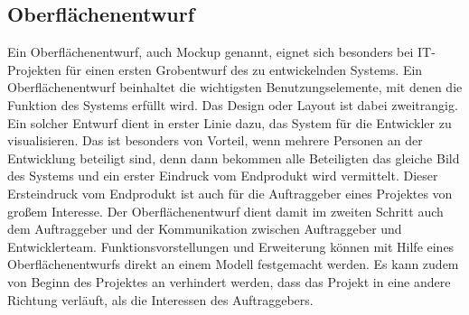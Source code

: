 \subsection{Oberflächenentwurf}
\label{sec:Oberflaechenentwuf}

Ein Oberflächenentwurf, auch Mockup genannt, eignet sich besonders bei IT-Projekten für einen ersten Grobentwurf des zu entwickelnden Systems. Ein Oberflächenentwurf beinhaltet die wichtigsten Benutzungselemente, mit denen die Funktion des Systems erfüllt wird. Das Design oder Layout ist dabei zweitrangig. Ein solcher Entwurf dient in erster Linie dazu, das System für die Entwickler zu visualisieren. Das ist besonders von Vorteil, wenn mehrere Personen an der Entwicklung beteiligt sind, denn dann bekommen alle Beteiligten das gleiche Bild des Systems und ein erster Eindruck vom Endprodukt wird vermittelt. Dieser Ersteindruck vom Endprodukt ist auch für die Auftraggeber eines Projektes von großem Interesse. Der Oberflächenentwurf dient damit im zweiten Schritt auch dem Auftraggeber und der Kommunikation zwischen Auftraggeber und Entwicklerteam. Funktionsvorstellungen und Erweiterung können mit Hilfe eines Oberflächenentwurfs direkt an einem Modell festgemacht werden. Es kann zudem von Beginn des Projektes an verhindert werden, dass das Projekt in eine andere Richtung verläuft, als die Interessen des Auftraggebers.


